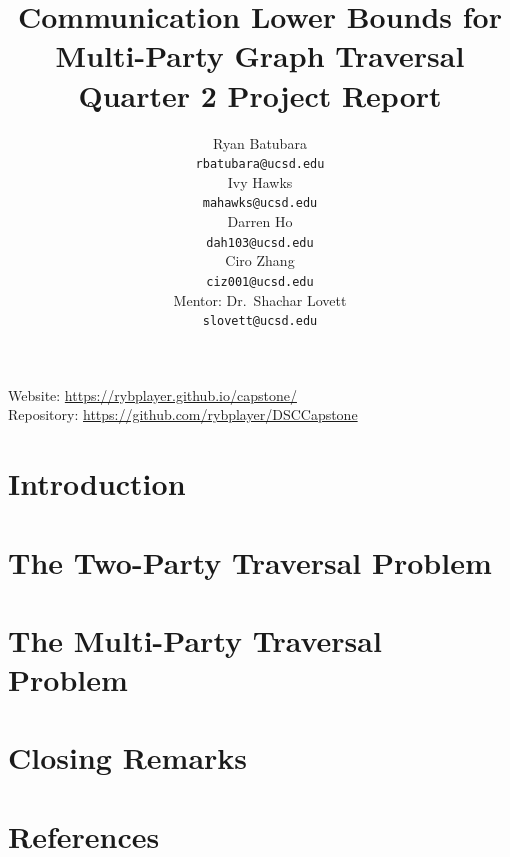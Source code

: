 \documentclass[12pt,letterpaper]{article}
\title{Communication Lower Bounds for \\
Multi-Party Graph Traversal \medbreak
\large Quarter 2 Project Report}
\author{
    Ryan Batubara \\ 
    {\tt \small{rbatubara@ucsd.edu}} \\\And
    Ivy Hawks \\
    {\tt \small{mahawks@ucsd.edu}} \\\And
    Darren Ho \\
    {\tt \small{dah103@ucsd.edu}} \\\And
    Ciro Zhang \\
    {\tt \small{ciz001@ucsd.edu}} \\\And
    Mentor: Dr.\ Shachar Lovett \\
    {\tt \small{slovett@ucsd.edu}} \\}
\begin{document}
\maketitle



\begin{abstract}
    
\end{abstract}

\begin{center}
Website: \url{https://rybplayer.github.io/capstone/} \\
Repository: \url{https://github.com/rybplayer/DSCCapstone}
\end{center}

\maketoc
\clearpage


\section{Introduction}
\label{sec:introduction}


\section{The Two-Party Traversal Problem}
\label{sec:two-party}



\section{The Multi-Party Traversal Problem}
\label{sec:multi-party}


\section{Closing Remarks}
\label{sec:Closing-remarks}


\section{References}
\makereference



% 
% 
% 
\end{document}
